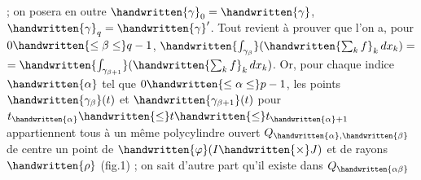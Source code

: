 ; on posera en outre $\handwritten{\gamma}_0=\handwritten{\gamma}$, $\handwritten{\gamma}_q=\handwritten{\gamma}'$. Tout revient à prouver que l'on a, pour $0\handwritten{\leq\beta\leq}q-1$, $\handwritten{\int_{\gamma_\beta}}(\handwritten{\sum_k f}_k\,dx_k)=$ $=\handwritten{\int_{\gamma_{\beta+1}}}(\handwritten{\sum_k f}_k\,dx_k)$. Or, pour chaque indice $\handwritten{\alpha}$ tel que $0\handwritten{\leq\alpha\leq}p-1$, les points $\handwritten{\gamma_\beta}(t)$ et $\handwritten{\gamma_{\beta+1}}(t)$ pour $t_{\handwritten{\alpha}}\handwritten{\leq}t\handwritten{\leq}t_{\handwritten{\alpha}+1}$ appartiennent tous à un même polycylindre ouvert $Q_{\handwritten{\alpha},\handwritten{\beta}}$ de centre un point de $\handwritten{\varphi}(I\handwritten{\times}J)$ et de rayons $\handwritten{\rho}$ (fig.1) ; on sait d'autre part qu'il existe dans $Q_{\handwritten{\alpha\beta}}$
